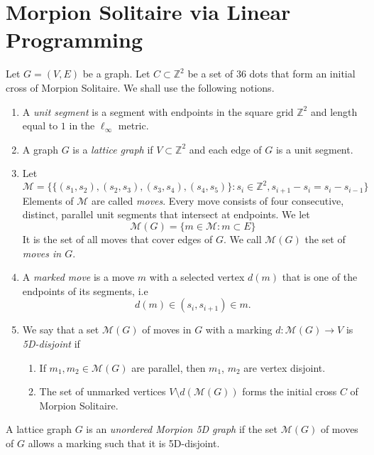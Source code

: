 \section{Morpion Solitaire via Linear Programming}
\label{sec:linear}

\begin{definition}
  Let $G = (V, E)$ be a graph. 
  Let $C \subset \mathbb{Z}^2$ be a set of $36$ dots that form an initial cross of Morpion Solitaire.
  We shall use the following notions.
  \begin{enumerate}
    \item A \emph{unit segment} is a segment with endpoints in the square grid $\mathbb{Z}^2$ and length 
    	equal to $1$ in the $\ell_\infty$ metric.
    \item A graph $G$ is a \emph{lattice graph} if $V \subset \mathbb{Z}^2$
      and each edge of $G$ is a unit segment.
    \item Let 
    \[
      \mathcal{M} = \{ \{ (s_1, s_2), (s_2, s_3), (s_3, s_4), (s_4, s_5) \} \colon s_i \in \mathbb{Z}^2, s_{i+1} - s_i = s_i - s_{i-1} \}
    \]
    Elements of $\mathcal{M}$ are called \emph{moves}. 
    Every move consists of four consecutive, distinct, parallel unit segments that intersect at endpoints.
    We let
    \[
      \mathcal{M}(G) = \{ m \in \mathcal{M} \colon m \subset E \}
    \]
    It is the set of all moves that cover edges of $G$. We call $\mathcal{M}(G)$ the set of \emph{moves in $G$}.
    \item A \emph{marked move} is a move $m$ with a selected vertex $d(m)$ that is one of the endpoints
      of its segments, i.e
      \[
      	d(m) \in (s_i, s_{i+1}) \in m.
      \]
    \item We say that a set $\mathcal{M}(G)$ of moves in $G$ with a marking $d \colon \mathcal{M}(G) \to V$ is \emph{5D-disjoint} if
      \begin{enumerate}
        \item If $m_1, m_2 \in \mathcal{M}(G)$ are parallel, then $m_1$, $m_2$ are vertex disjoint.
        \item The set of unmarked vertices $V \setminus d(\mathcal{M}(G))$ forms the initial cross $C$ of Morpion Solitaire.
      \end{enumerate}
  \end{enumerate}
\end{definition}

\begin{definition}
  A lattice graph $G$ is an \emph{unordered Morpion 5D graph} if the set $\mathcal{M}(G)$ of moves of $G$ allows a marking such that it is 5D-disjoint.
\end{definition}

